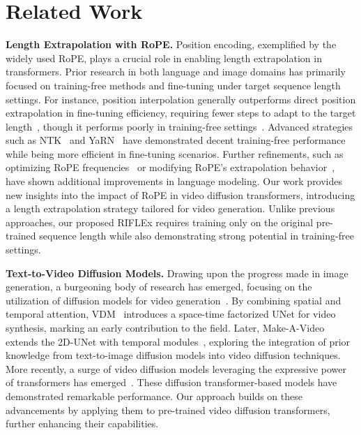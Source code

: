 \section{Related Work}

\textbf{Length Extrapolation  with RoPE.}
Position encoding, exemplified by the widely used RoPE, plays a crucial role in enabling length extrapolation in transformers. Prior research in both language and image domains has primarily focused on training-free methods and fine-tuning under target sequence length settings. For instance, position interpolation generally outperforms direct position extrapolation in fine-tuning efficiency, requiring fewer steps to adapt to the target length~\cite{chen2023extending}, though it performs poorly in training-free settings~\cite{zhuo2024lumina}. Advanced strategies such as NTK~\cite{bloc97} and YaRN~\cite{peng2023yarn} have demonstrated decent training-free performance while being more efficient in fine-tuning scenarios.
Further refinements, such as optimizing RoPE frequencies~\citep{ding2024longrope} or modifying RoPE's extrapolation behavior~\cite{hu2024longcontext}, have shown additional improvements in language modeling. 
Our work provides new insights into the impact of RoPE in video diffusion transformers, introducing a length extrapolation strategy tailored for video generation. Unlike previous approaches, our proposed RIFLEx requires training only on the original pre-trained sequence length while also demonstrating strong potential in training-free settings.

\textbf{Text-to-Video Diffusion Models.} 
Drawing upon the progress made in image generation, a burgeoning body of research has emerged, focusing on the utilization of diffusion models for video generation~\cite{kong2024hunyuanvideo,yang2024cogvideox,ho2022imagen,polyak2024movie,videoworldsimulators2024,zhou2024allegro,genmo2024mochi,zheng2024opensora,blattmann2023stable,lin2024open,xing2023dynamicrafter,chen2023videocrafter1,chen2024videocrafter2,he2022lvdm}. By combining spatial and temporal attention, VDM~\cite{he2022lvdm} introduces a space-time factorized UNet for video synthesis, marking an early contribution to the field. Later, Make-A-Video extends the 2D-UNet with temporal modules~\cite{singer2022make}, exploring the integration of prior knowledge from text-to-image diffusion models into video diffusion techniques. More recently, a surge of video diffusion models leveraging the expressive power of transformers has emerged~\cite{lin2024open,zheng2024opensora,kong2024hunyuanvideo,yang2024cogvideox,bao2024vidu,videoworldsimulators2024,genmo2024mochi}. These diffusion transformer-based models have demonstrated remarkable performance. Our approach builds on these advancements by applying them to pre-trained video diffusion transformers, further enhancing their capabilities.


